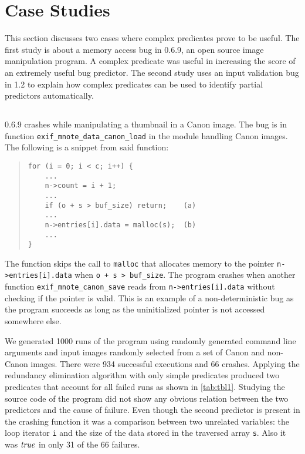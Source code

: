 
\section{Case Studies}
\label{sec-qual}
This section discusses two cases where complex predicates prove to be useful.  The first study is about a memory access bug in  0.6.9, an open source image manipulation program.  A complex predicate was useful in increasing the score of an extremely useful bug predictor.  The second study uses an input validation bug in  1.2 to explain how complex predicates can be used to identify partial predictors automatically.

\subsection{\large\textbf{}}
\label{sec-exif}

 0.6.9 crashes while manipulating a thumbnail in a Canon image.  The bug is in function \texttt{exif\_mnote\_data\_canon\_load} in the module handling Canon images.  The following is a snippet from said function:
\begin{quote}
\begin{verbatim}
for (i = 0; i < c; i++) {
    ...
    n->count = i + 1;
    ...
    if (o + s > buf_size) return;    (a)
    ...
    n->entries[i].data = malloc(s);  (b)
    ...
}
\end{verbatim}
\end{quote}

The function skips the call to \texttt{malloc} that allocates memory to the pointer \texttt{n->entries[i].data} when \texttt{o + s > buf\_size}.  The program crashes when another function \texttt{exif\_mnote\_canon\_save} reads from \texttt{n->entries[i].data} without checking if the pointer is valid.  This is an example of a non-deterministic bug as the program succeeds as long as the uninitialized pointer is not accessed somewhere else.

We generated 1000 runs of the program using randomly generated command line arguments and input images randomly selected from a set of Canon and non-Canon images.  There were 934 successful executions and 66 crashes.  Applying the redundancy elimination algorithm with only simple predicates produced two predicates that account for all failed runs as shown in \autoref{tab:tbl1}.  Studying the source code of the program did not show any obvious relation between the two predictors and the cause of failure.  Even though the second predictor is present in the crashing function it was a comparison between two unrelated variables: the loop iterator \texttt{i} and the size of the data stored in the traversed array \texttt{s}.  Also it was $\mathit{true}$ in only 31 of the 66 failures.

